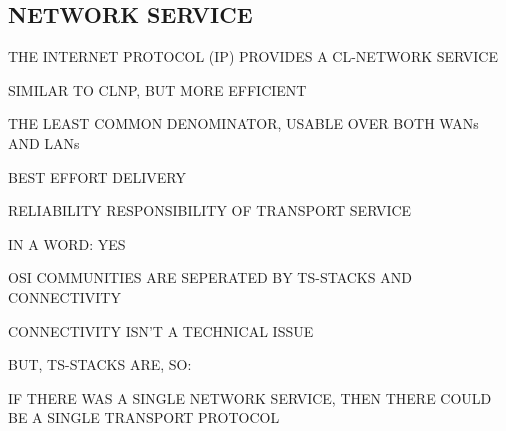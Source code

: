 \begin{bwslide}
\part*	{NETWORK SERVICE}\bf

\begin{nrtc}
\item	THE INTERNET PROTOCOL (IP) PROVIDES A CL-NETWORK SERVICE
    \begin{nrtc}
    \item	SIMILAR TO CLNP, BUT MORE EFFICIENT
    \end{nrtc}

\item	THE LEAST COMMON DENOMINATOR, USABLE OVER BOTH WANs AND LANs
    \begin{nrtc}
    \item	BEST EFFORT DELIVERY

    \item	RELIABILITY RESPONSIBILITY OF TRANSPORT SERVICE
    \end{nrtc}
\end{nrtc}
\end{bwslide}


\begin{bwslide}

\begin{nrtc}
\item	IN A WORD: YES

\item	OSI COMMUNITIES ARE SEPERATED BY TS-STACKS AND CONNECTIVITY

\item	CONNECTIVITY ISN'T A TECHNICAL ISSUE

\item	BUT, TS-STACKS ARE, SO:
    \begin{nrtc}
    \item	IF THERE WAS A SINGLE NETWORK SERVICE,
		THEN THERE COULD BE A SINGLE TRANSPORT PROTOCOL
    \end{nrtc}
\end{nrtc}
\end{bwslide}



